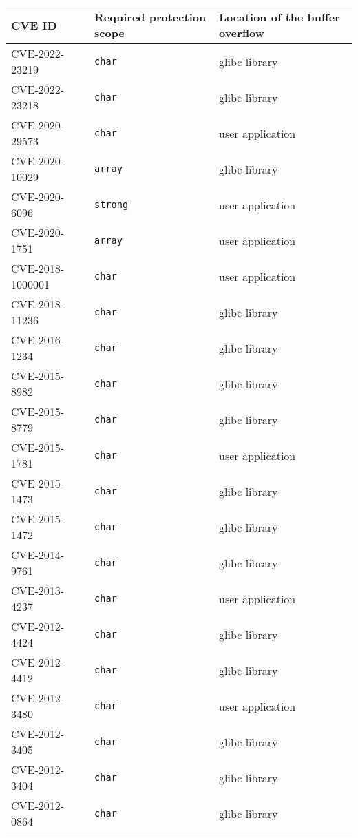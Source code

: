 \begin{tabular}{lll}
\toprule
CVE ID & Required protection scope & Location of the buffer overflow \\
\midrule
CVE-2022-23219 & \texttt{char} & glibc library \\
CVE-2022-23218 & \texttt{char} & glibc library \\
CVE-2020-29573 & \texttt{char} & user application \\
CVE-2020-10029 & \texttt{array} & glibc library \\
CVE-2020-6096 & \texttt{strong} & user application \\
CVE-2020-1751 & \texttt{array} & user application \\
CVE-2018-1000001 & \texttt{char} & user application \\
CVE-2018-11236 & \texttt{char} & glibc library \\
CVE-2016-1234 & \texttt{char} & glibc library \\
CVE-2015-8982 & \texttt{char} & glibc library \\
CVE-2015-8779 & \texttt{char} & glibc library \\
CVE-2015-1781 & \texttt{char} & user application \\
CVE-2015-1473 & \texttt{char} & glibc library \\
CVE-2015-1472 & \texttt{char} & glibc library \\
CVE-2014-9761 & \texttt{char} & glibc library \\
CVE-2013-4237 & \texttt{char} & user application \\
CVE-2012-4424 & \texttt{char} & glibc library \\
CVE-2012-4412 & \texttt{char} & glibc library \\
CVE-2012-3480 & \texttt{char} & user application \\
CVE-2012-3405 & \texttt{char} & glibc library \\
CVE-2012-3404 & \texttt{char} & glibc library \\
CVE-2012-0864 & \texttt{char} & glibc library \\
\bottomrule
\end{tabular}